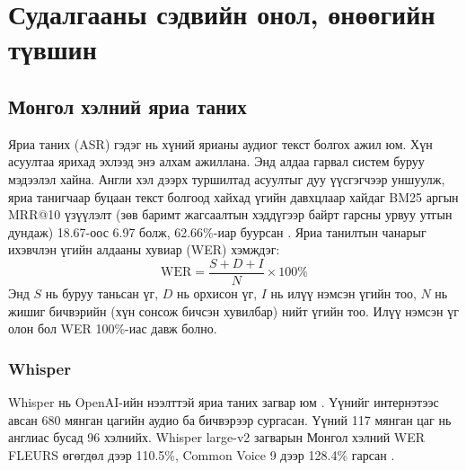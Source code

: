 \chapter{Судалгааны сэдвийн онол, өнөөгийн түвшин}
\label{ch:literature}


\section{Монгол хэлний яриа таних}
\label{sec:lit-asr}

Яриа таних (\ac{ASR}) гэдэг нь хүний ярианы аудиог текст болгох ажил юм. Хүн асуултаа ярихад эхлээд энэ алхам ажиллана. Энд алдаа гарвал систем буруу мэдээлэл хайна. Англи хэл дээрх туршилтад асуултыг дуу үүсгэгчээр уншуулж, яриа танигчаар буцаан текст болгоод хайхад үгийн давхцлаар хайдаг BM25 аргын MRR@10 үзүүлэлт (зөв баримт жагсаалтын хэддүгээр байрт гарсны урвуу утгын дундаж) 18.67-оос 6.97 болж, 62.66\%-иар буурсан \cite{sidiropoulos2022asr}. Яриа танилтын чанарыг ихэвчлэн үгийн алдааны хувиар (\ac{WER}) хэмждэг:
\begin{equation}
\mathrm{WER} = \frac{S + D + I}{N} \times 100\%
\label{eq:wer}
\end{equation}
Энд $S$ нь буруу таньсан үг, $D$ нь орхисон үг, $I$ нь илүү нэмсэн үгийн тоо, $N$ нь жишиг бичвэрийн (хүн сонсож бичсэн хувилбар) нийт үгийн тоо. Илүү нэмсэн үг олон бол WER 100\%-иас давж болно.

\subsection{Whisper}

Whisper нь OpenAI-ийн нээлттэй яриа таних загвар юм \cite{radford2023whisper}. Үүнийг интернэтээс авсан 680 мянган цагийн аудио ба бичвэрээр сургасан. Үүний 117 мянган цаг нь англиас бусад 96 хэлнийх. Whisper large-v2 загварын Монгол хэлний WER FLEURS өгөгдөл дээр 110.5\%, Common Voice 9 дээр 128.4\% гарсан \cite{radford2023whisper}. %

